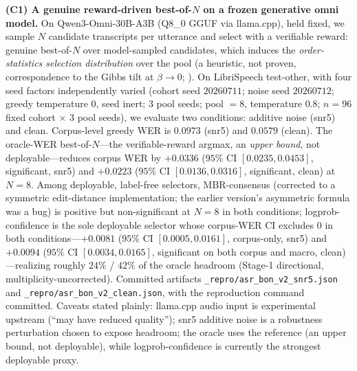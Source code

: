 \textbf{(C1) A genuine reward-driven best-of-$N$ on a frozen generative omni model.} On Qwen3-Omni-30B-A3B (Q8\_0 GGUF via llama.cpp), held fixed, we sample $N$ candidate transcripts per utterance and select with a verifiable reward: genuine best-of-$N$ over model-sampled candidates, which induces the \emph{order-statistics selection distribution} over the pool (a heuristic, not proven, correspondence to the Gibbs tilt at $\beta\!\to\!0$; ). On LibriSpeech test-other, with four seed factors independently varied (cohort seed $20260711$; noise seed $20260712$; greedy temperature $0$, seed inert; $3$ pool seeds; pool $=8$, temperature $0.8$; $n=96$ fixed cohort $\times$ 3 pool seeds), we evaluate two conditions: additive noise (snr5) and clean. Corpus-level greedy WER is $0.0973$ (snr5) and $0.0579$ (clean). The oracle-WER best-of-$N$---the verifiable-reward argmax, an \emph{upper bound}, not deployable---reduces corpus WER by $+0.0336$ ($95\%$ CI $[0.0235,0.0453]$, significant, snr5) and $+0.0223$ ($95\%$ CI $[0.0136,0.0316]$, significant, clean) at $N=8$. Among deployable, label-free selectors, MBR-consensus (corrected to a symmetric edit-distance implementation; the earlier version's asymmetric formula was a bug) is positive but non-significant at $N=8$ in both conditions; logprob-confidence is the sole deployable selector whose corpus-WER CI excludes $0$ in both conditions---$+0.0081$ ($95\%$ CI $[0.0005,0.0161]$, corpus-only, snr5) and $+0.0094$ ($95\%$ CI $[0.0034,0.0165]$, significant on both corpus and macro, clean)---realizing roughly $24\%$ / $42\%$ of the oracle headroom (Stage-1 directional, multiplicity-uncorrected). Committed artifacts \texttt{\_repro/asr\_bon\_v2\_snr5.json} and \texttt{\_repro/asr\_bon\_v2\_clean.json}, with the reproduction command committed. Caveats stated plainly: llama.cpp audio input is experimental upstream (``may have reduced quality''); snr5 additive noise is a robustness perturbation chosen to expose headroom; the oracle uses the reference (an upper bound, not deployable), while logprob-confidence is currently the strongest deployable proxy.

